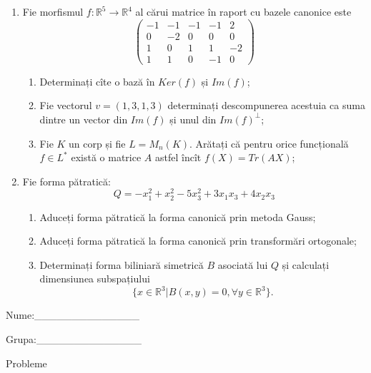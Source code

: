 \documentclass{article}
\begin{document}
\begin{enumerate}
 \item Fie morfismul $f:\mathbb{R}^5 \to \mathbb{R}^4$ al cărui matrice în raport cu bazele canonice este
$$\begin{pmatrix}
-1&-1&-1&-1&2\\
0&-2&0&0&0\\
1&0&1&1&-2\\
1&1&0&-1&0
\end{pmatrix}$$

\begin{enumerate}
\item Determinați cîte o bază în $Ker(f)$ și $Im(f)$;
\item Fie vectorul $v=(1,3,1,3)$ determinați descompunerea acestuia ca suma dintre un vector din $Im(f)$ și unul din $Im(f)^\perp$;
\item Fie $K$ un corp și fie $L=M_n(K)$. Arătați că pentru orice funcțională $f \in L^*$ există o matrice $A$ astfel încît $f(X)=Tr(AX)$;
\end{enumerate}
\item Fie forma pătratică:
$$Q= -x_1^2+x_2^2-5x_3^2+3x_1x_3+4x_2x_3$$

\begin{enumerate}
\item Aduceți forma pătratică la forma canonică prin metoda Gauss;
\item Aduceți forma pătratică la forma canonică prin transformări ortogonale;
\item Determinați forma biliniară simetrică $B$ asociată lui $Q$ și calculați dimensiunea subspațiului
$$\{x \in \mathbb{R}^3 | B(x,y)=0,\forall y \in \mathbb{R}^3\}.$$

\end{enumerate}
\end{enumerate}
\newpage
\begin{flushright}
Nume:\_\_\_\_\_\_\_\_\_\_\_\_\_\_
 
 
Grupa:\_\_\_\_\_\_\_\_\_\_\_\_\_\_
\end{flushright}
\begin{center}
\vspace{2cm}
{\Large Probleme}
\vspace{2cm}
\end{center}
\end{document}
